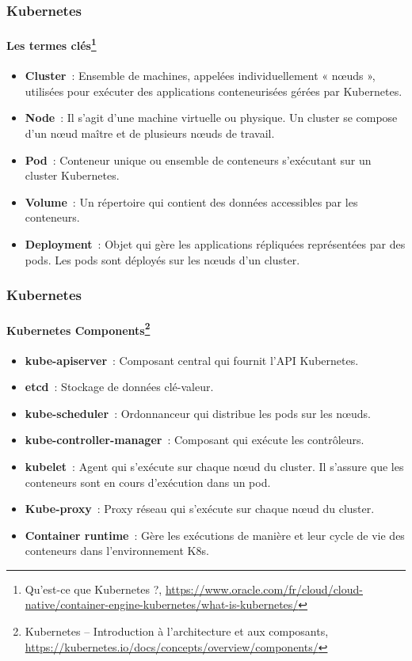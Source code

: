 \documentclass{beamer}
\begin{document}
    \begin{frame}
        \transdissolve
        \frametitle{Kubernetes}
        \framesubtitle{Les termes clés\footnote{\label{k8soracle}Qu’est-ce que Kubernetes ?, \url{https://www.oracle.com/fr/cloud/cloud-native/container-engine-kubernetes/what-is-kubernetes/}}}
        \begin{itemize}
            \item \textbf{Cluster}~: Ensemble de machines, appelées individuellement « nœuds », utilisées pour exécuter des applications conteneurisées gérées par Kubernetes.
            \item \textbf{Node}~: Il s'agit d'une machine virtuelle ou physique.
            Un cluster se compose d'un nœud maître et de plusieurs nœuds de travail.
            \item \textbf{Pod}~: Conteneur unique ou ensemble de conteneurs s’exécutant sur un cluster Kubernetes.
            \item \textbf{Volume}~: Un répertoire qui contient des données accessibles par les conteneurs.
            \item \textbf{Deployment}~: Objet qui gère les applications répliquées représentées par des pods.
            Les pods sont déployés sur les nœuds d’un cluster.
        \end{itemize}
    \end{frame}

    \begin{frame}
        \transdissolve
        \frametitle{Kubernetes}
        \framesubtitle{Kubernetes Components\footnote{\label{k8scompnents}Kubernetes – Introduction à l’architecture et aux composants, \url{https://kubernetes.io/docs/concepts/overview/components/}}}
        \begin{itemize}
            \item \textbf{kube-apiserver}~: Composant central qui fournit l'API Kubernetes.
            \item \textbf{etcd}~: Stockage de données clé-valeur.
            \item \textbf{kube-scheduler}~: Ordonnanceur qui distribue les pods sur les nœuds.
            \item \textbf{kube-controller-manager}~: Composant qui exécute les contrôleurs.
            \item \textbf{kubelet}~: Agent qui s'exécute sur chaque nœud du cluster.
            Il s'assure que les conteneurs sont en cours d'exécution dans un pod.
            \item \textbf{Kube-proxy}~: Proxy réseau qui s'exécute sur chaque nœud du cluster.
            \item \textbf{Container runtime}~: Gère les exécutions de manière  et leur cycle de vie des conteneurs dans l'environnement K8s.
        \end{itemize}
    \end{frame}
\end{document}
